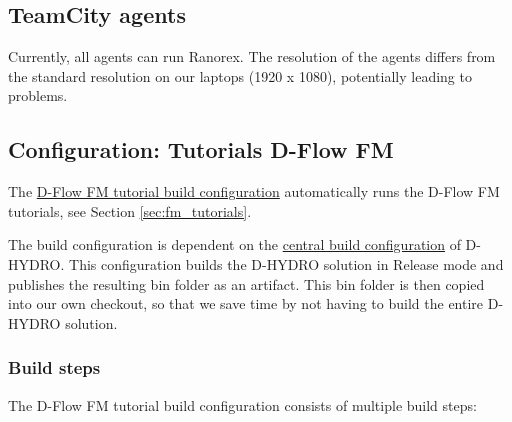 \documentclass{article}
\begin{document}
\subsection{TeamCity agents}

Currently, all agents can run Ranorex. The resolution of the agents differs from the standard resolution on our laptops (1920 x 1080), potentially leading to problems.   

\subsection{Configuration: Tutorials D-Flow FM}

The \href{https://dpcbuild.deltares.nl/buildConfiguration/DHydroUserInterface_DHydro_AutomatedTests_RanorexTests_TutorialsDFlowFm?mode=builds}{D-Flow FM tutorial build configuration} automatically runs the D-Flow FM tutorials, see Section \ref{sec:fm_tutorials}.

The build configuration is dependent on the \href{https://dpcbuild.deltares.nl/buildConfiguration/DHydroUserInterface_DHydro_BuildConfiguration?mode=builds}{central build configuration} of D-HYDRO. This configuration builds the D-HYDRO solution in Release mode and publishes the resulting bin folder as an artifact. This bin folder is then copied into our own checkout, so that we save time by not having to build the entire D-HYDRO solution. 

\subsubsection{Build steps}

The D-Flow FM tutorial build configuration consists of multiple build steps:
\end{document}
